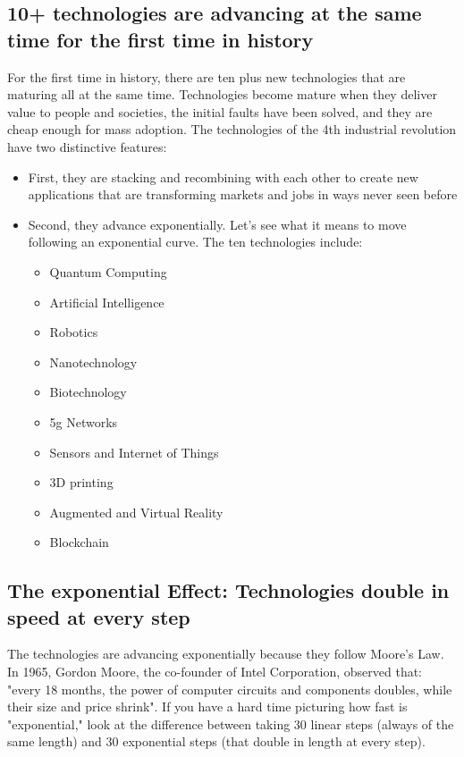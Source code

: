 \documentclass[11pt]{book} %
\begin{document}
	\subsection{10+ technologies are advancing at the same time for the first time in history}
		For the first time in history, there are ten plus new technologies that are maturing all at the same time. Technologies become mature when they deliver value to people and societies, the initial faults have been solved, and they are cheap enough for mass adoption. 
		The technologies of the 4th industrial revolution have two distinctive features: 
		\begin{itemize}
			\item  First, they are stacking and recombining with each other to create new applications that are transforming markets and jobs in ways never seen before
			\item  Second, they advance exponentially. Let's see what it means to move following an exponential curve. The ten technologies include:
			\begin{itemize}
				\item Quantum Computing
				\item Artificial Intelligence
				\item Robotics
				\item Nanotechnology
				\item Biotechnology
				\item 5g Networks
				\item Sensors and Internet of Things
				\item 3D printing
				\item Augmented and Virtual Reality
				\item Blockchain
			\end{itemize}
		\end{itemize}
	\subsection{The exponential Effect: Technologies double in speed at every step}
		The technologies are advancing exponentially because they follow Moore's Law. 
		In 1965, Gordon Moore, the co-founder of Intel Corporation, observed that: "every 18 months, the power of computer circuits and components doubles, while their size and price shrink". 
		If you have a hard time picturing how fast is "exponential," look at the difference between taking 30 linear steps (always of the same length) and 30 exponential steps (that double in length at every step).
\end{document}
